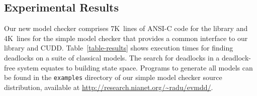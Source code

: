 \documentclass[a4paper,oneside,11pt,pdftex]{llncs}
\begin{document}
\subsection{Experimental Results}

Our new model checker comprises 7K~lines of ANSI-C code for the library
and 4K~lines for the simple model checker that provides a common interface
to our library and CUDD. Table~\vref{table-results} shows
execution times for finding deadlocks on a suite of classical models.
The search for deadlocks in a deadlock-free system equates to building state space.
Programs to generate all models can be found in the \texttt{examples} directory
of our simple model checker source distribution, available at \url{http://research.nianet.org/~radu/evmdd/}.
\end{document}
